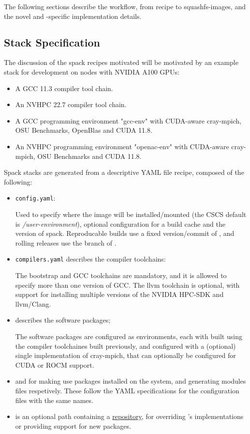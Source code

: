 The following sections describe the workflow, from recipe to squashfs-images, and the novel and \crayex-specific implementation details.

\subsection{Stack Specification}

The discussion of the spack recipes motivated will be motivated by an example stack for development on nodes with NVIDIA A100 GPUs:
\begin{itemize}
    \item A GCC 11.3 compiler tool chain.
    \item An NVHPC 22.7 compiler tool chain.
    \item A GCC programming environment "gcc-env" with CUDA-aware cray-mpich, OSU Benchmarks, OpenBlas and CUDA 11.8.
    \item An NVHPC programming environment "openac-env" with CUDA-aware cray-mpich, OSU Benchmarks and CUDA 11.8.
\end{itemize}

Spack stacks are generated from a descriptive YAML file recipe, composed of the following:
\begin{itemize}
    \item  \lstinline{config.yaml}:
        
        Used to specify where the image will be installed/mounted (the CSCS default is \emph{/user-environment}), optional configuration for a \spack build cache and the version of spack. Reproducable builds use a fixed version/commit of \spack, and rolling releases use the  branch of \spack.
    \item \lstinline{compilers.yaml} describes the compiler toolchains:
        
        The bootstrap and GCC toolchains are mandatory, and it is allowed to specify more than one version of GCC.
        The llvm toolchain is optional, with support for installing multiple versions of the NVIDIA HPC-SDK and llvm/Clang.
    \item {} describes the software packages;
        
        The software packages are configured as environments, each with built using the compiler toolchaines built previously, and configured with a (optional) single implementation of cray-mpich, that can optionally be configured for CUDA or ROCM support.
    \item {} and 
        for making \spack use packages installed on the system, and generating modules files respetively.
        These follow the YAML specifications for the \spack configuration files with the same names.
    \item {}
        is an optional path containing a \href{https://spack.readthedocs.io/en/latest/repositories.html}{\spack repository}, for overriding \spack's implementations or providing support for new packages.
\end{itemize}

